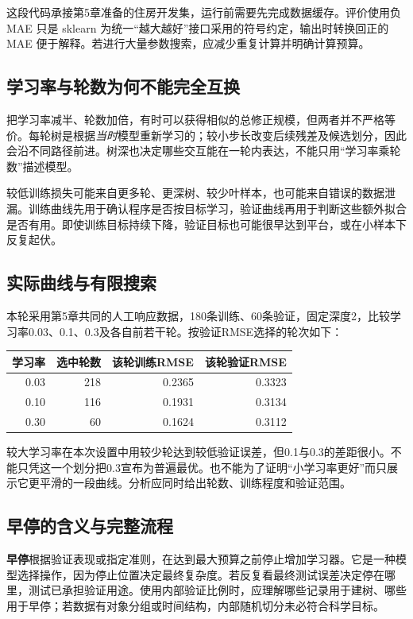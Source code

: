 这段代码承接第5章准备的住房开发集，运行前需要先完成数据缓存。评价使用负 MAE 只是 sklearn 为统一“越大越好”接口采用的符号约定，输出时转换回正的 MAE 便于解释。若进行大量参数搜索，应减少重复计算并明确计算预算。

\subsection{学习率与轮数为何不能完全互换}
把学习率减半、轮数加倍，有时可以获得相似的总修正规模，但两者并不严格等价。每轮树是根据\emph{当时}模型重新学习的；较小步长改变后续残差及候选划分，因此会沿不同路径前进。树深也决定哪些交互能在一轮内表达，不能只用“学习率乘轮数”描述模型。

较低训练损失可能来自更多轮、更深树、较少叶样本，也可能来自错误的数据泄漏。训练曲线先用于确认程序是否按目标学习，验证曲线再用于判断这些额外拟合是否有用。即使训练目标持续下降，验证目标也可能很早达到平台，或在小样本下反复起伏。

\subsection{实际曲线与有限搜索}
本轮采用第5章共同的人工响应数据，180条训练、60条验证，固定深度2，比较学习率0.03、0.1、0.3及各自前若干轮。按验证RMSE选择的轮次如下：
\begin{center}\small
\begin{tabular}{rrrr}\toprule
学习率&选中轮数&该轮训练RMSE&该轮验证RMSE\\\midrule
0.03&218&0.2365&0.3323\\
0.10&116&0.1931&0.3134\\
0.30&60&0.1624&0.3112\\\bottomrule
\end{tabular}\end{center}

较大学习率在本次设置中用较少轮达到较低验证误差，但0.1与0.3的差距很小。不能只凭这一个划分把0.3宣布为普遍最优。也不能为了证明“小学习率更好”而只展示它更平滑的一段曲线。分析应同时给出轮数、训练程度和验证范围。

\subsection{早停的含义与完整流程}
\textbf{早停}根据验证表现或指定准则，在达到最大预算之前停止增加学习器。它是一种模型选择操作，因为停止位置决定最终复杂度。若反复看最终测试误差决定停在哪里，测试已承担验证用途。使用内部验证比例时，应理解哪些记录用于建树、哪些用于早停；若数据有对象分组或时间结构，内部随机切分未必符合科学目标。

